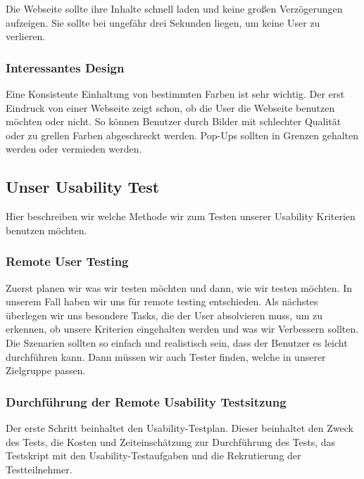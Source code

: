 \noindent Die Webseite sollte ihre Inhalte schnell laden und keine großen Verzögerungen
aufzeigen. Sie sollte bei ungefähr drei Sekunden liegen, um keine User zu verlieren.

\subsubsection{Interessantes Design}

\noindent Eine Konsistente Einhaltung von bestimmten Farben ist sehr wichtig. Der erst Eindruck von
einer Webseite zeigt schon, ob die User die Webseite benutzen möchten oder nicht.
So können Benutzer durch Bilder mit schlechter Qualität oder zu grellen Farben abgeschreckt werden.
Pop-Ups sollten in Grenzen gehalten werden oder vermieden werden.

\subsection{Unser Usability Test}
Hier beschreiben wir welche Methode wir zum Testen unserer Usability Kriterien benutzen
möchten.

\subsubsection{Remote User Testing}

\noindent Zuerst planen wir was wir testen möchten und dann, wie wir testen möchten. In unserem Fall haben wir uns
für remote testing entschieden. Als nächstes überlegen wir uns besondere Tasks, die der User absolvieren muss, um
zu erkennen, ob unsere Kriterien eingehalten werden und was wir Verbessern sollten.
Die Szenarien sollten so einfach und realistisch sein, dass der Benutzer es leicht durchführen kann.
Dann müssen wir auch Tester finden, welche in unserer Zielgruppe passen.

\subsubsection{Durchführung der Remote Usability Testsitzung}

Der erste Schritt beinhaltet den Usability-Testplan. Dieser beinhaltet den Zweck des Tests, 
die Kosten und Zeiteinschätzung zur Durchführung des Tests, das Testskript mit den Usability-Testaufgaben und die Rekrutierung der Testteilnehmer. 
\\


